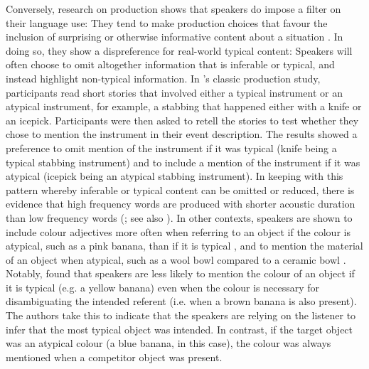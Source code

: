 \documentclass[output=paper,colorlinks,citecolor=brown]{langscibook}
\begin{document}
Conversely, research on production shows that speakers do impose a filter on their language use: They tend to make production choices that favour the inclusion of surprising or otherwise informative content about a situation \citep[e.g.][]{BrownDell1987, LockridgeBrennan2002}. In doing so, they show a dispreference for real-world typical content: Speakers will often choose to omit altogether information that is inferable or typical, and instead highlight non-typical information. In \citeauthor{BrownDell1987}’s \citeyearpar{BrownDell1987} classic production study, participants read short stories that involved either a typical instrument or an atypical instrument, for example, a stabbing that happened either with a knife or an icepick. Participants were then asked to retell the stories to test whether they chose to mention the instrument in their event description. The results showed a preference to omit mention of the instrument if it was typical (knife being a typical stabbing instrument) and to include a mention of the instrument if it was atypical (icepick being an atypical stabbing instrument). In keeping with this pattern whereby inferable or typical content can be omitted or reduced, there is evidence that high frequency words are produced with shorter acoustic duration than low frequency words (\cite{AylettTurk2004}; see also \cite{LevyJaeger2007, Jaeger2010, Kravtchenko2014, lemke2021}). In other contexts, speakers are shown to include colour adjectives more often when referring to an object if the colour is atypical, such as a pink banana, than if it is typical \citep{Sedivy2003, WesterbeekEtAl2015, RubioFernandez2016, DegenEtAl2020}, and to mention the material of an object when atypical, such as a wool bowl compared to a ceramic bowl \citep{MitchellVanDeemter2013}. Notably, \citet{DegenEtAl2020} found that speakers are less likely to mention the colour of an object if it is typical (e.g. a yellow banana) even when the colour is necessary for disambiguating the intended referent (i.e. when a brown banana is also present). The authors take this to indicate that the speakers are relying on the listener to infer that the most typical object was intended. In contrast, if the target object was an atypical colour (a blue banana, in this case), the colour was always mentioned when a competitor object was present.
\end{document}

